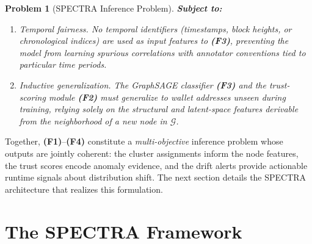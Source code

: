 \documentclass[journal]{IEEEtran}
\newtheorem{problem}{Problem}[section]
\begin{document}
\begin{mdframed}[linewidth=0.8pt, innertopmargin=8pt, innerbottommargin=8pt,
                 innerleftmargin=10pt, innerrightmargin=10pt]
\begin{problem}[SPECTRA Inference Problem]
\medskip
\textbf{Subject to:}
\begin{enumerate}
  \item[\textbf{(S1)}] \emph{Temporal fairness.} No temporal identifiers
        (timestamps, block heights, or chronological indices) are used as
        input features to \textbf{(F3)}, preventing the model from learning
        spurious correlations with annotator conventions tied to particular
        time periods.
  \item[\textbf{(S2)}] \emph{Inductive generalization.} The GraphSAGE
        classifier \textbf{(F3)} and the trust-scoring module \textbf{(F2)}
        must generalize to wallet addresses unseen during training, relying
        solely on the structural and latent-space features derivable from
        the neighborhood of a new node in $\mathcal{G}$.
\end{enumerate}
\end{problem}
\end{mdframed}

\noindent
Together, \textbf{(F1)}--\textbf{(F4)} constitute a \emph{multi-objective}
inference problem whose outputs are jointly coherent: the cluster assignments
inform the node features, the trust scores encode anomaly evidence, and the
drift alerts provide actionable runtime signals about distribution shift.
The next section details the SPECTRA architecture that realizes this
formulation.


%

\section{The SPECTRA Framework}
\label{sec:framework}
\end{document}
